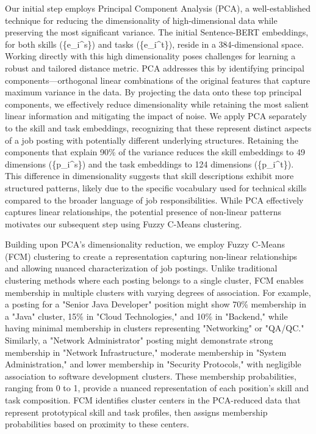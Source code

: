 Our initial step employs Principal Component Analysis (PCA), a well-established technique for reducing the dimensionality 
of high-dimensional data while preserving the most significant variance. The initial Sentence-BERT embeddings, 
for both skills (\{e_i^s\}) and tasks (\{e_i^t\}), reside in a 384-dimensional space. Working directly with this 
high dimensionality poses challenges for learning a robust and tailored distance metric. PCA addresses this by 
identifying principal components—orthogonal linear combinations of the original features that capture maximum 
variance in the data. By projecting the data onto these top principal components, we effectively reduce 
dimensionality while retaining the most salient linear information and mitigating the impact of noise. We apply 
PCA separately to the skill and task embeddings, recognizing that these represent distinct aspects of a job posting 
with potentially different underlying structures. Retaining the components that explain 90\% of the variance 
reduces the skill embeddings to 49 dimensions (\{p_i^s\}) and the task embeddings to 124 dimensions (\{p_i^t\}). 
This difference in dimensionality suggests that skill descriptions exhibit more structured patterns, likely 
due to the specific vocabulary used for technical skills compared to the broader language of job responsibilities. 
While PCA effectively captures linear relationships, the potential presence of non-linear patterns motivates 
our subsequent step using Fuzzy C-Means clustering.

Building upon PCA's dimensionality reduction, we employ Fuzzy C-Means (FCM) clustering to create a representation 
capturing non-linear relationships and allowing nuanced characterization of job postings. Unlike traditional 
clustering methods where each posting belongs to a single cluster, FCM enables membership in multiple clusters 
with varying degrees of association. For example, a posting for a "Senior Java Developer" position might show 
70\% membership in a "Java" cluster, 15\% in "Cloud Technologies," and 10\% in 
"Backend," while having minimal membership in clusters representing "Networking" 
or "QA/QC." Similarly, a "Network Administrator" posting might demonstrate strong membership in 
"Network Infrastructure," moderate membership in "System Administration," and 
lower membership in "Security Protocols," with negligible association to software development clusters. 
These membership probabilities, ranging from 0 to 1, provide a nuanced representation of each position's 
skill and task composition. FCM identifies cluster centers in the PCA-reduced data that represent 
prototypical skill and task profiles, then assigns membership probabilities based on proximity to these centers.

